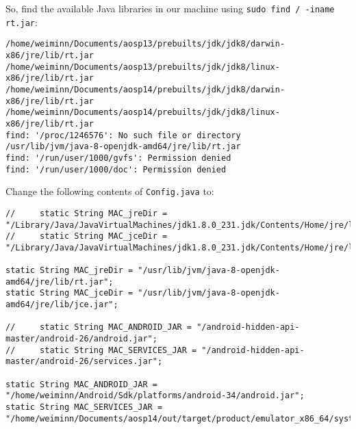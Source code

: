 So, find the available Java libraries in our machine using \texttt{sudo find / -iname rt.jar}:
\begin{lstlisting}
/home/weiminn/Documents/aosp13/prebuilts/jdk/jdk8/darwin-x86/jre/lib/rt.jar
/home/weiminn/Documents/aosp13/prebuilts/jdk/jdk8/linux-x86/jre/lib/rt.jar
/home/weiminn/Documents/aosp14/prebuilts/jdk/jdk8/darwin-x86/jre/lib/rt.jar
/home/weiminn/Documents/aosp14/prebuilts/jdk/jdk8/linux-x86/jre/lib/rt.jar
find: '/proc/1246576': No such file or directory
/usr/lib/jvm/java-8-openjdk-amd64/jre/lib/rt.jar
find: '/run/user/1000/gvfs': Permission denied
find: '/run/user/1000/doc': Permission denied
\end{lstlisting}

Change the following contents of \texttt{Config.java} to:
\begin{lstlisting}
//     static String MAC_jreDir = "/Library/Java/JavaVirtualMachines/jdk1.8.0_231.jdk/Contents/Home/jre/lib/rt.jar";
//     static String MAC_jceDir = "/Library/Java/JavaVirtualMachines/jdk1.8.0_231.jdk/Contents/Home/jre/lib/jce.jar";

static String MAC_jreDir = "/usr/lib/jvm/java-8-openjdk-amd64/jre/lib/rt.jar";
static String MAC_jceDir = "/usr/lib/jvm/java-8-openjdk-amd64/jre/lib/jce.jar";

//     static String MAC_ANDROID_JAR = "/android-hidden-api-master/android-26/android.jar";
//     static String MAC_SERVICES_JAR = "/android-hidden-api-master/android-26/services.jar";

static String MAC_ANDROID_JAR = "/home/weiminn/Android/Sdk/platforms/android-34/android.jar";
static String MAC_SERVICES_JAR = "/home/weiminn/Documents/aosp14/out/target/product/emulator_x86_64/system/framework/services.jar";
\end{lstlisting} 

